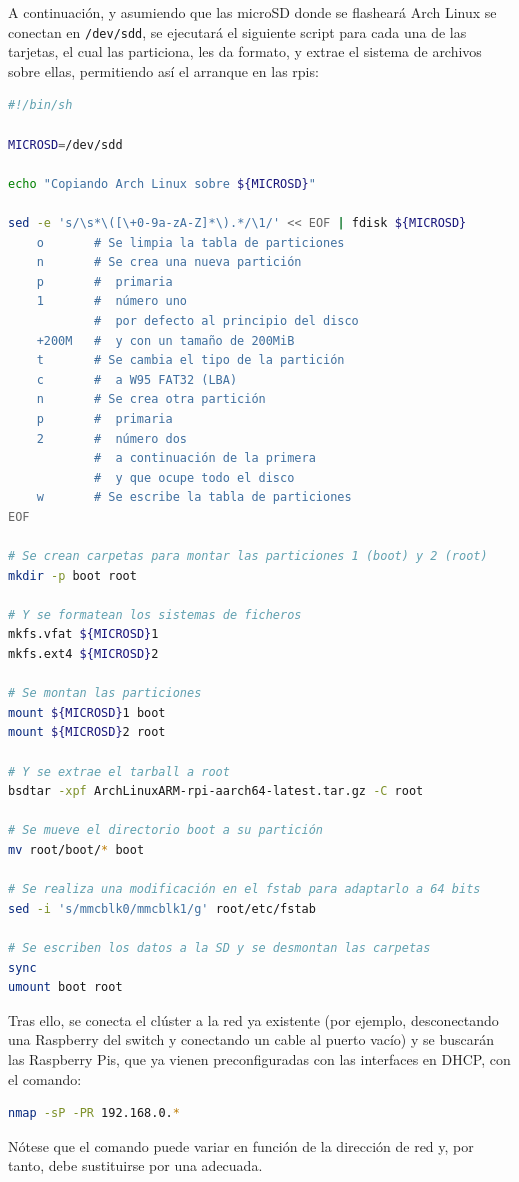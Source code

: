 A continuación, y asumiendo que las microSD donde se flasheará Arch Linux se conectan en \texttt{/dev/sdd}, se ejecutará el siguiente script para cada una de las tarjetas, el cual las particiona, les da formato, y extrae el sistema de archivos sobre ellas, permitiendo así el arranque en las \acrlong{rpi}s:

\begin{lstlisting}[language=bash]
#!/bin/sh

MICROSD=/dev/sdd

echo "Copiando Arch Linux sobre ${MICROSD}"

sed -e 's/\s*\([\+0-9a-zA-Z]*\).*/\1/' << EOF | fdisk ${MICROSD}
    o       # Se limpia la tabla de particiones
    n       # Se crea una nueva partición
    p       #  primaria
    1       #  número uno
            #  por defecto al principio del disco
    +200M   #  y con un tamaño de 200MiB
    t       # Se cambia el tipo de la partición
    c       #  a W95 FAT32 (LBA)
    n       # Se crea otra partición
    p       #  primaria
    2       #  número dos
            #  a continuación de la primera
            #  y que ocupe todo el disco
    w       # Se escribe la tabla de particiones
EOF

# Se crean carpetas para montar las particiones 1 (boot) y 2 (root)
mkdir -p boot root

# Y se formatean los sistemas de ficheros
mkfs.vfat ${MICROSD}1
mkfs.ext4 ${MICROSD}2

# Se montan las particiones
mount ${MICROSD}1 boot
mount ${MICROSD}2 root

# Y se extrae el tarball a root
bsdtar -xpf ArchLinuxARM-rpi-aarch64-latest.tar.gz -C root

# Se mueve el directorio boot a su partición
mv root/boot/* boot

# Se realiza una modificación en el fstab para adaptarlo a 64 bits
sed -i 's/mmcblk0/mmcblk1/g' root/etc/fstab

# Se escriben los datos a la SD y se desmontan las carpetas
sync
umount boot root
\end{lstlisting}

Tras ello, se conecta el clúster a la red ya existente (por ejemplo, desconectando una Raspberry del switch y conectando un cable al puerto vacío) y se buscarán las Raspberry Pis, que ya vienen preconfiguradas con las interfaces en DHCP, con el comando:

\begin{lstlisting}[language=bash]
nmap -sP -PR 192.168.0.*
\end{lstlisting}
Nótese que el comando puede variar en función de la dirección de red y, por tanto, debe sustituirse por una adecuada.

